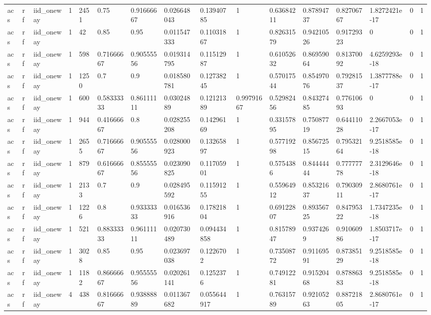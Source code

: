 \begin{tabular}{llllllllllllllll}
acs & rf & iid\_oneway & 1 & 2451 & 0.75 & 0.91666667 & 0.026648043 & 0.13940785 & 1 & 0.63684211 & 0.87894737 & 0.82706767 & 1.8272421e-17 & 0 & 1 \\
acs & rf & iid\_oneway & 1 & 42 & 0.85 & 0.95 & 0.011547333 & 0.11031867 & 1 & 0.82631579 & 0.94210526 & 0.91729323 & 0 & 0 & 1 \\
acs & rf & iid\_oneway & 1 & 598 & 0.71666667 & 0.90555556 & 0.019314795 & 0.11512987 & 1 & 0.61052632 & 0.86959064 & 0.81370092 & 4.6259293e-18 & 0 & 1 \\
acs & rf & iid\_oneway & 1 & 1250 & 0.7 & 0.9 & 0.018580781 & 0.12738245 & 1 & 0.57017544 & 0.85497076 & 0.79281537 & 1.3877788e-17 & 0 & 1 \\
acs & rf & iid\_oneway & 1 & 600 & 0.58333333 & 0.86111111 & 0.03024889 & 0.12121389 & 0.99791667 & 0.52982456 & 0.84327485 & 0.77610693 & 0 & 0 & 1 \\
acs & rf & iid\_oneway & 1 & 944 & 0.41666667 & 0.8 & 0.028255208 & 0.14296169 & 1 & 0.33157895 & 0.75087719 & 0.64411028 & 2.2667053e-17 & 0 & 1 \\
acs & rf & iid\_oneway & 1 & 2655 & 0.71666667 & 0.90555556 & 0.028000923 & 0.13265897 & 1 & 0.57719298 & 0.85672515 & 0.79532164 & 9.2518585e-18 & 0 & 1 \\
acs & rf & iid\_oneway & 1 & 879 & 0.61666667 & 0.85555556 & 0.023090825 & 0.11705901 & 1 & 0.5754386 & 0.84444444 & 0.77777778 & 2.3129646e-18 & 0 & 1 \\
acs & rf & iid\_oneway & 1 & 2133 & 0.7 & 0.9 & 0.028495592 & 0.11591255 & 1 & 0.55964912 & 0.85321637 & 0.79030911 & 2.8680761e-17 & 0 & 1 \\
acs & rf & iid\_oneway & 1 & 1226 & 0.8 & 0.93333333 & 0.016536916 & 0.17821804 & 1 & 0.69122807 & 0.89356725 & 0.84795322 & 1.7347235e-18 & 0 & 1 \\
acs & rf & iid\_oneway & 1 & 521 & 0.88333333 & 0.96111111 & 0.020730489 & 0.094434858 & 1 & 0.81578947 & 0.9374269 & 0.91060986 & 1.8503717e-17 & 0 & 1 \\
acs & rf & iid\_oneway & 1 & 3028 & 0.85 & 0.95 & 0.023697038 & 0.1226702 & 1 & 0.73508772 & 0.91169591 & 0.87385129 & 9.2518585e-18 & 0 & 1 \\
acs & rf & iid\_oneway & 1 & 1182 & 0.86666667 & 0.95555556 & 0.020261141 & 0.1252376 & 1 & 0.74912281 & 0.91520468 & 0.87886383 & 9.2518585e-18 & 0 & 1 \\
acs & rf & iid\_oneway & 4 & 438 & 0.81666667 & 0.93888889 & 0.011367682 & 0.055644917 & 1 & 0.76315789 & 0.92105263 & 0.88721805 & 2.8680761e-17 & 0 & 1 \\

\end{tabular}

